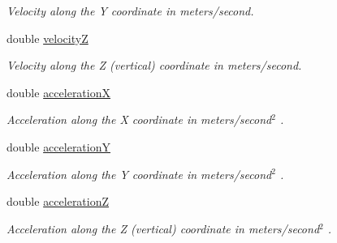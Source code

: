 \begin{CompactItemize}
\begin{CompactList}\small\item\em Velocity along the Y coordinate in meters/second. \item\end{CompactList}\item 
\hypertarget{interface_i_m_s_r_point_object_380a176d59dab2b4d723fecfba56bede}{
double \hyperlink{interface_i_m_s_r_point_object_380a176d59dab2b4d723fecfba56bede}{velocityZ}}
\label{interface_i_m_s_r_point_object_380a176d59dab2b4d723fecfba56bede}

\begin{CompactList}\small\item\em Velocity along the Z (vertical) coordinate in meters/second. \item\end{CompactList}\item 
\hypertarget{interface_i_m_s_r_point_object_dc3adae499ae6f1097f6829459915d14}{
double \hyperlink{interface_i_m_s_r_point_object_dc3adae499ae6f1097f6829459915d14}{accelerationX}}
\label{interface_i_m_s_r_point_object_dc3adae499ae6f1097f6829459915d14}

\begin{CompactList}\small\item\em Acceleration along the X coordinate in meters/second$^{\mbox{2}}$ . \item\end{CompactList}\item 
\hypertarget{interface_i_m_s_r_point_object_c636c2a6549441ee0450079e7e760ed3}{
double \hyperlink{interface_i_m_s_r_point_object_c636c2a6549441ee0450079e7e760ed3}{accelerationY}}
\label{interface_i_m_s_r_point_object_c636c2a6549441ee0450079e7e760ed3}

\begin{CompactList}\small\item\em Acceleration along the Y coordinate in meters/second$^{\mbox{2}}$ . \item\end{CompactList}\item 
\hypertarget{interface_i_m_s_r_point_object_e062b40a4616e6138e4bded66c068ae9}{
double \hyperlink{interface_i_m_s_r_point_object_e062b40a4616e6138e4bded66c068ae9}{accelerationZ}}
\label{interface_i_m_s_r_point_object_e062b40a4616e6138e4bded66c068ae9}

\begin{CompactList}\small\item\em Acceleration along the Z (vertical) coordinate in meters/second$^{\mbox{2}}$ . \item\end{CompactList}\end{CompactItemize}


